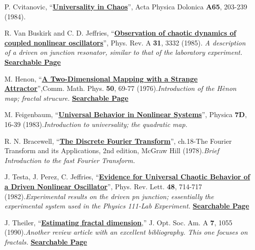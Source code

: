 \documentclass{../lab}
\begin{document}
\begin{thebibliography}{}
     P. Cvitanovic, ``\href{http://physics111.lib.berkeley.edu/Physics111/Reprints/NLD/03-Universality\_in\_Chaos.pdf}{\textbf{Universality in Chaos}}'', Acta Physica Dolonica \textbf{A65}, 203-239 (1984).

     R. Van Buskirk and C. D. Jeffries, ``\href{http://link.aps.org/doi/10.1103/PhysRevA.31.3332}{\textbf{Observation of chaotic dynamics of coupled nonlinear oscillators}}'', Phys. Rev. A \textbf{31}, 3332 (1985). \emph{A description of a driven on junction resonator, similar to that of the laboratory experiment.} \href{http://physics111.lib.berkeley.edu/Physics111/Reprints/NLD/09-Observation\_of\_Chaotic\_Dynamics.pdf}{\textbf{Searchable Page}}

     M. Henon, ``\href{http://projecteuclid.org/DPubS?verb=Display&version=1.0&service=UI&handle=euclid.cmp/1103900150&page=record}{\textbf{A Two-Dimensional Mapping with a Strange Attractor}}'',Comm. Math. Phys. \textbf{50}, 69-77 (1976).\emph{Introduction of the Hènon map; fractal strucure.} \href{http://physics111.lib.berkeley.edu/Physics111/Reprints/NLD/06-A\_Two-Dimensional\_Mapping.pdf}{\textbf{Searchable Page}}

     M. Feigenbaum, ``\href{http://physics111.lib.berkeley.edu/Physics111/Reprints/NLD/05-Universal_Behavior.pdf}{\textbf{Universal Behavior in Nonlinear Systems}}'', Physica \textbf{7D}, 16-39 (1983).\emph{Introduction to universality; the quadratic map.}

     R. N. Bracewell, ``\href{http://physics111.lib.berkeley.edu/Physics111/Reprints/NLD/07-The\_Discrete\_Fourier\_Transform.pdf}{\textbf{The Discrete Fourier Transform}}'', ch.18-The Fourier Transform and its Applications, 2nd edition, McGraw Hill (1978).\emph{Brief Introduction to the fast Fourier Transform.}

     J. Testa, J. Perez, C. Jeffries, ``\href{http://prl.aps.org/abstract/PRL/v48/i11/p714\_1}{\textbf{Evidence for Universal Chaotic Behavior of a Driven Nonlinear Oscillator}}'', Phys. Rev. Lett. \textbf{48}, 714-717 (1982).\emph{Experimental results on the driven pn junction; essentially the experimental system used in the Physics 111-Lab Experiment.} \href{http://physics111.lib.berkeley.edu/Physics111/Reprints/NLD/08-Evidence\_for\_Universal\_Chaotic\_Behavior.pdf}{\textbf{Searchable Page}}

     J. Theiler, ``\href{http://www.opticsinfobase.org/abstract.cfm?uri=josaa-7-6-1055}{\textbf{Estimating fractal dimension}},'' J. Opt. Soc. Am. A \textbf{7}, 1055 (1990).\emph{Another review article with an excellent bibliography. This one focuses on fractals. } \href{http://physics111.lib.berkeley.edu/Physics111/Reprints/NLD/16-Estimating\_Fractal\_Dimension.pdf}{\textbf{Searchable Page}}


\end{thebibliography}
\end{document}
